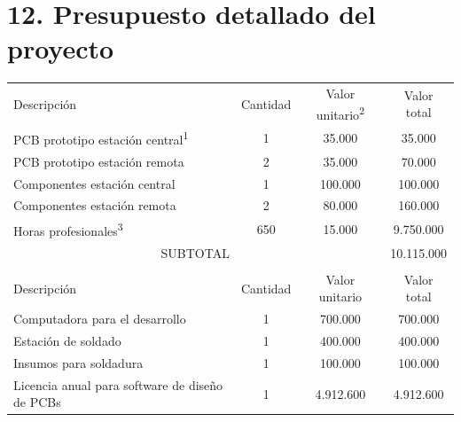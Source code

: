 \documentclass[
11pt, %
]{charter}
\begin{document}
\section{12. Presupuesto detallado del proyecto}
\label{sec:presupuesto}

\begin{table}[htpb]
\centering
\begin{tabularx}{\linewidth}{@{}|X|c|r|r|@{}}
\hline
\rowcolor[HTML]{C0C0C0} 
\multicolumn{4}{|c|}{\cellcolor[HTML]{C0C0C0}COSTOS DIRECTOS} \\ \hline
\rowcolor[HTML]{C0C0C0} 
Descripción &
	\multicolumn{1}{c|}{\cellcolor[HTML]{C0C0C0}Cantidad} &
	\multicolumn{1}{c|}{\cellcolor[HTML]{C0C0C0}Valor unitario\textsuperscript{2}} &
	\multicolumn{1}{c|}{\cellcolor[HTML]{C0C0C0}Valor total} \\ \hline
PCB prototipo estación central\textsuperscript{1} &
	\multicolumn{1}{c|}{1} &
	\multicolumn{1}{c|}{35.000} &
	\multicolumn{1}{c|}{35.000} \\ \hline
PCB prototipo estación remota &
	\multicolumn{1}{c|}{2} &
	\multicolumn{1}{c|}{35.000} &
	\multicolumn{1}{c|}{70.000} \\ \hline
Componentes estación central &
	\multicolumn{1}{c|}{1} &
	\multicolumn{1}{c|}{100.000} &
	\multicolumn{1}{c|}{100.000} \\ \hline
Componentes estación remota &
	\multicolumn{1}{c|}{2} &
	\multicolumn{1}{c|}{80.000} &
	\multicolumn{1}{c|}{160.000} \\ \hline
Horas profesionales\textsuperscript{3} &
	\multicolumn{1}{c|}{650} &
	\multicolumn{1}{c|}{15.000} &
	\multicolumn{1}{c|}{9.750.000} \\ \hline

\multicolumn{3}{|c|}{SUBTOTAL} &
  \multicolumn{1}{c|}{10.115.000} \\ \hline
  
\rowcolor[HTML]{C0C0C0} 
\multicolumn{4}{|c|}{\cellcolor[HTML]{C0C0C0}COSTOS INDIRECTOS} \\ \hline
\rowcolor[HTML]{C0C0C0} 
Descripción &
	\multicolumn{1}{c|}{\cellcolor[HTML]{C0C0C0}Cantidad} &
	\multicolumn{1}{c|}{\cellcolor[HTML]{C0C0C0}Valor unitario} &
	\multicolumn{1}{c|}{\cellcolor[HTML]{C0C0C0}Valor total} \\ \hline
Computadora para el desarrollo &
	\multicolumn{1}{c|}{1} &
	\multicolumn{1}{c|}{700.000} &
	\multicolumn{1}{c|}{700.000} \\ \hline
Estación de soldado &
	\multicolumn{1}{c|}{1} &
	\multicolumn{1}{c|}{400.000} &
	\multicolumn{1}{c|}{400.000} \\ \hline
Insumos para soldadura &
	\multicolumn{1}{c|}{1} &
	\multicolumn{1}{c|}{100.000} &
	\multicolumn{1}{c|}{100.000} \\ \hline
Licencia anual para software de diseño de PCBs &
	\multicolumn{1}{c|}{1} &
	\multicolumn{1}{c|}{4.912.600} &
	\multicolumn{1}{c|}{4.912.600} \\ \hline


\end{tabularx}
\end{table}
\end{document}
